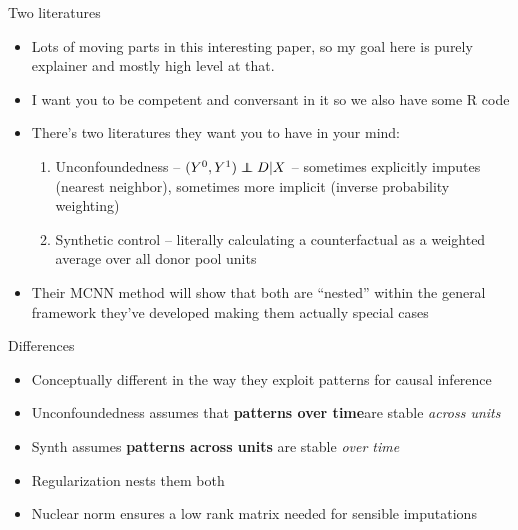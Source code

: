 \documentclass{beamer}
\newcommand\independent{\protect\mathpalette{\protect\independenT}{\perp}}
\def\independenT#1#2{\mathrel{\rlap{$#1#2$}\mkern2mu{#1#2}}}
\begin{document}
\begin{frame}{Two literatures}

\begin{itemize}
\item Lots of moving parts in this interesting paper, so my goal here is purely explainer and mostly high level at that. 
\item I want you to be competent and conversant in it so we also have some R code
\item There's two literatures they want you to have in your mind:
	\begin{enumerate}
	\item Unconfoundedness -- $(Y^0,Y^1)\independent D|X$ -- sometimes explicitly imputes (nearest neighbor), sometimes more implicit (inverse probability weighting)
	\item Synthetic control -- literally calculating a counterfactual as a weighted average over all donor pool units
	\end{enumerate}
\item Their MCNN method will show that both are ``nested'' within the general framework they've developed making them actually special cases
\end{itemize}

\end{frame}


\begin{frame}{Differences}

\begin{itemize}
\item Conceptually different in the way they exploit patterns for causal inference
\item Unconfoundedness assumes that \textbf{patterns over time}are stable \emph{across units}
\item Synth assumes \textbf{patterns across units} are stable \emph{over time}
\item Regularization nests them both
\item Nuclear norm ensures a low rank matrix needed for sensible imputations

\end{itemize}

\end{frame}
\end{document}
